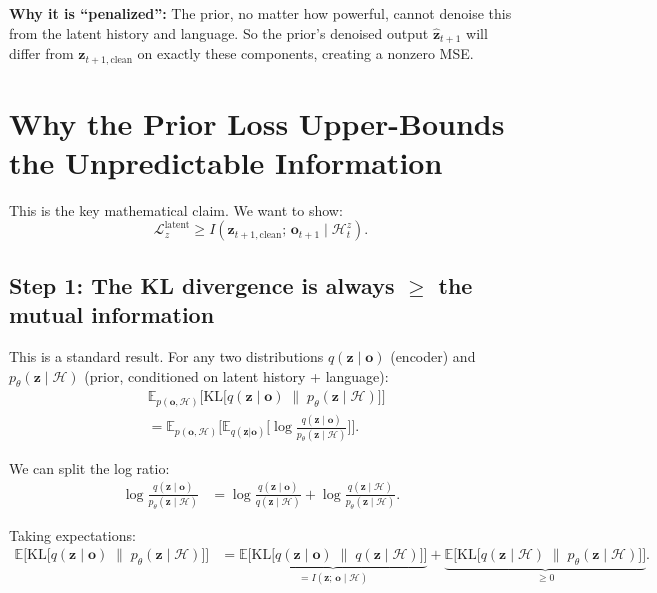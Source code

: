 \documentclass{article}
\newcommand{\vo}{\bm{o}}
\newcommand{\vz}{\bm{z}}
\newcommand{\loss}{\mathcal{L}}
\newcommand{\E}{\mathbb{E}}
\newcommand{\KL}{\mathrm{KL}}
\begin{document}
\textbf{Why it is ``penalized'':} The prior, no matter how powerful, cannot denoise this from the latent history and language. So the prior's denoised output $\hat{\vz}_{t+1}$ will differ from $\vz_{t+1,\text{clean}}$ on exactly these components, creating a nonzero MSE.


\section{Why the Prior Loss Upper-Bounds the Unpredictable Information}

This is the key mathematical claim. We want to show:
\begin{equation}
  \loss_z^{\text{latent}} \geq I(\vz_{t+1,\text{clean}};\, \vo_{t+1} \mid \mathcal{H}_t^z).
\end{equation}

\subsection{Step 1: The KL divergence is always $\geq$ the mutual information}

This is a standard result. For any two distributions $q(\vz \mid \vo)$ (encoder) and $p_\theta(\vz \mid \mathcal{H})$ (prior, conditioned on latent history + language):
\begin{align}
  &\E_{p(\vo, \mathcal{H})}\Big[\KL\!\big[q(\vz \mid \vo) \;\|\; p_\theta(\vz \mid \mathcal{H})\big]\Big] \nonumber \\
  &= \E_{p(\vo, \mathcal{H})}\Big[\E_{q(\vz|\vo)}\Big[\log \frac{q(\vz \mid \vo)}{p_\theta(\vz \mid \mathcal{H})}\Big]\Big].
  \label{eq:kl_expand}
\end{align}

We can split the log ratio:
\begin{align}
  \log \frac{q(\vz \mid \vo)}{p_\theta(\vz \mid \mathcal{H})}
  &= \log \frac{q(\vz \mid \vo)}{q(\vz \mid \mathcal{H})} + \log \frac{q(\vz \mid \mathcal{H})}{p_\theta(\vz \mid \mathcal{H})}.
  \label{eq:split}
\end{align}

Taking expectations:
\begin{align}
  \E\Big[\KL\!\big[q(\vz \mid \vo) \;\|\; p_\theta(\vz \mid \mathcal{H})\big]\Big]
  &= \underbrace{\E\Big[\KL\!\big[q(\vz \mid \vo) \;\|\; q(\vz \mid \mathcal{H})\big]\Big]}_{= I(\vz;\, \vo \mid \mathcal{H})}
  + \underbrace{\E\Big[\KL\!\big[q(\vz \mid \mathcal{H}) \;\|\; p_\theta(\vz \mid \mathcal{H})\big]\Big]}_{\geq 0}.
  \label{eq:decompose_kl}
\end{align}
\end{document}
